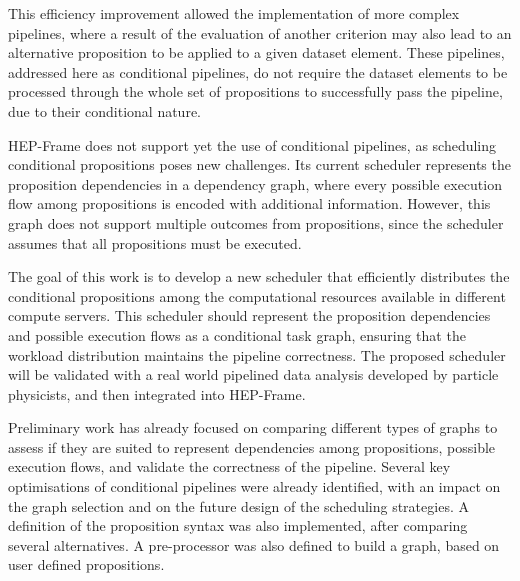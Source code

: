 \documentclass[
  twoside,
  11pt, a4paper,
  footinclude=true,
  headinclude=true,
  cleardoublepage=empty
]{scrbook}
\begin{document}



This efficiency improvement allowed 
the implementation of more complex pipelines, where a result of the evaluation of another criterion may also lead to an alternative 
proposition to be applied to a given dataset element.
These pipelines, addressed here as conditional pipelines, do not require the dataset elements to be processed through the whole set of propositions to successfully pass the pipeline, due to their conditional nature.

HEP-Frame does not support yet the use of conditional pipelines, as scheduling conditional propositions poses new challenges.
Its current scheduler represents the proposition dependencies in a dependency graph, where every possible execution flow among propositions is encoded with additional information.
However, this graph does not support multiple outcomes from propositions, since the scheduler assumes that all propositions must be executed.

The goal of this work is to develop a new scheduler that efficiently distributes the conditional propositions among the computational resources available in different compute servers.
This scheduler should represent the proposition dependencies and possible execution flows as a conditional task graph, ensuring that the workload distribution maintains the pipeline correctness.
The proposed scheduler will be validated with a real world pipelined data analysis developed by particle physicists, and then integrated into HEP-Frame.

Preliminary work has already focused on comparing different types of graphs to assess if they are suited to represent dependencies among propositions, possible execution flows, and validate the correctness of the pipeline.
Several key optimisations of conditional pipelines were already identified, with an impact on the graph selection and on the future design of the scheduling strategies.
A definition of the proposition syntax was also implemented, after comparing several alternatives. A pre-processor was also defined to build a graph, based on user defined propositions.
\end{document}
